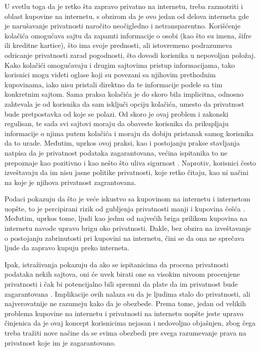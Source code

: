 \documentclass[a4paper]{article}
\begin{document}
\par U svetlu toga da je retko šta zapravo privatno na internetu, treba razmotriti i oblast kupovine na internetu, s obzirom da je ovo jedan od delova interneta gde je narušavanje privatnosti naročito neočigledno i netransparentno. Korišćenje kolačića omogućava sajtu da zapamti informacije o osobi (kao što su imena, šifre ili kreditne kartice), što ima svoje prednosti, ali istovremeno podrazumeva odricanje privatnosti zarad pogodnosti, što dovodi korisnika u nepovoljan položaj. Kako kolačići omogućavaju i drugim sajtovima pristup informacijama, tako korisnici mogu videti oglase koji su povezani sa njihovim prethodnim kupovinama, iako nisu pristali direktno da te informacije podele sa tim konkretnim sajtom. Sama praksa kolačića je do skoro bila implicitna, odnosno zahtevala je od korisnika da sam isključi opciju kolačića, umesto da privatnost bude pretpostavka od koje se polazi. Od skoro je ovaj problem i zakonski regulisan, te sada svi sajtovi moraju da obaveste korisnika da prikupljaju informacije o njima putem kolačića i moraju da dobiju pristanak samog korisnika da to urade. Međutim, uprkos ovoj praksi, kao i postojanju prakse stavljanja natpisa da je privatnost podataka zagarantovana, većina ispitanika to ne prepoznaje kao pozitivno i kao nešto što uliva sigurnost \cite{cookies2}. Naprotiv, korisnici često izveštavaju da im nisu jasne politike privatnosti, koje retko čitaju, kao ni načini na koje je njihova privatnost zagrantovana.
\par Podaci pokazuju da što je veće iskustvo sa kupovinom na internetu i internetom uopšte, to je percipirani rizik od gubljenja privatnosti manji i kupovina češća \cite{cookies3}. Međutim, uprkos tome, ljudi kao jednu od najvećih briga prilikom kupovina na internetu navode upravo brigu oko privatnosti. Dakle, bez obzira na izveštavanje o postojanju zabrinutosti pri kupovini na internetu, čini se da ona ne sprečava ljude da zapravo kupuju preko interneta.
\par Ipak, istraživanja pokazuju da ako se ispitanicima da procena privatnosti podataka nekih sajtova, oni će uvek birati one sa visokim nivoom procenjene privatnosti i čak bi potencijalno bili spremni da plate da im privatnost bude zagarantovana \cite{cookies2}. Implikacije ovih nalaza su da je ljudima stalo do privatnosti, ali najverovatnije ne razumeju kako da je obezbede. Prema tome, jedan od velikih problema kupovine na internetu i privatnosti na internetu uopšte jeste upravo činjenica da je ovaj koncept korisnicima nejasan i nedovoljno objašnjen, zbog čega treba tražiti nove načine da se svima obezbedi pre svega razumevanje prava na privatnost koje im je zagarantovano.
\end{document}
